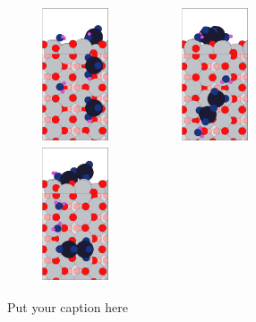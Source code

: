 \documentclass[aip,amsmath,amssymb,reprint, jcp]{revtex4-1}
\begin{document}
\begin{figure}[ht]
        \includegraphics[width=4cm,height=4cm]{V2O5_2H2O_TiO2_101_1by4cell_DFTcsr_Ov_g13.png}  
          \includegraphics[width=4cm,height=4cm]{V2O5_2H2O_TiO2_101_1by4cell_DFTcsr_Ov_g16.png}  
            \includegraphics[width=4cm,height=4cm]{V2O5_2H2O_TiO2_101_1by4cell_DFTcsr_Ov_g18.png}  
\caption{Put your caption here}
\label{fig:fig}
\end{figure}
\end{document}
